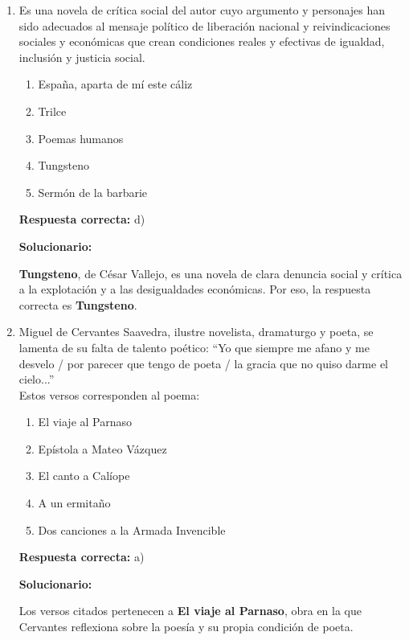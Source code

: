 \begin{enumerate}[resume]
	\item Es una novela de crítica social del autor cuyo argumento y personajes han sido adecuados al mensaje político de liberación nacional y reivindicaciones sociales y económicas que crean condiciones reales y efectivas de igualdad, inclusión y justicia social.
	\begin{enumerate}[label=\alph*)]
		\item España, aparta de mí este cáliz
		\item Trilce
		\item Poemas humanos
		\item Tungsteno
		\item Sermón de la barbarie
	\end{enumerate}
	\textbf{Respuesta correcta:} d)
	
	\vspace{2mm}
	\textbf{Solucionario:}
	
	\textbf{Tungsteno}, de César Vallejo, es una novela de clara denuncia social y crítica a la explotación y a las desigualdades económicas. Por eso, la respuesta correcta es \textbf{Tungsteno}.
	
	\vspace{6mm}
	
	\item Miguel de Cervantes Saavedra, ilustre novelista, dramaturgo y poeta, se lamenta de su falta de talento poético: ``Yo que siempre me afano y me desvelo / por parecer que tengo de poeta / la gracia que no quiso darme el cielo...''\\
	Estos versos corresponden al poema:
	\begin{enumerate}[label=\alph*)]
		\item El viaje al Parnaso
		\item Epístola a Mateo Vázquez
		\item El canto a Calíope
		\item A un ermitaño
		\item Dos canciones a la Armada Invencible
	\end{enumerate}
	\textbf{Respuesta correcta:} a)
	
	\vspace{2mm}
	\textbf{Solucionario:}
	
	Los versos citados pertenecen a \textbf{El viaje al Parnaso}, obra en la que Cervantes reflexiona sobre la poesía y su propia condición de poeta.
	
	\vspace{6mm}
	
\end{enumerate}

